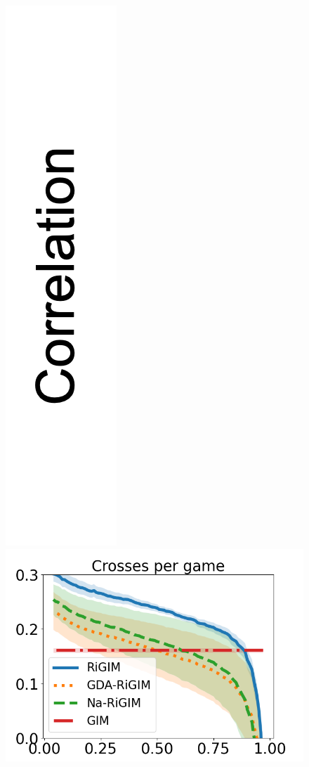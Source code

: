 \documentclass[letterpaper]{article} %
\begin{document}
\begin{figure}[htbp]
\begin{minipage}{0.01\textwidth}
    \includegraphics[scale=0.12]{figures/correlation_y_label.png}
    \end{minipage}
    \begin{minipage}{0.16\textwidth}
    \centering
    \includegraphics[scale=0.16]{figures/soccer_risk_curve_Crosses_shadow.png}\par

\end{minipage}
\end{figure}
\end{document}

